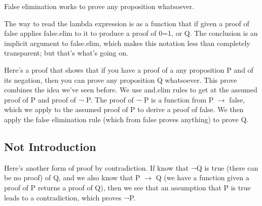 \documentclass[letterpaper,10pt,english]{sphinxmanual}
\begin{document}
False elimination works to prove any proposition whatsoever.

\begin{sphinxVerbatim}[commandchars=\\\{\}]
         
        
\end{sphinxVerbatim}

The way to read the lambda expression is as a function that if given a
proof of false applies false.elim to it to produce a proof of 0=1,
or Q. The conclusion is an implicit argument to false.elim, which
makes this notation less than completely transparent; but that’s
what’s going on.

Here’s a proof that shows that if you have a proof of a any
proposition P and of its negation, then you can prove any proposition
Q whatsoever.  This prove combines the idea we’ve seen before.  We use
and.elim rules to get at the assumed proof of P and proof of ¬ P. The
proof of ¬ P is a function from P \(\rightarrow\) false, which we apply to the
assumed proof of P to derive a proof of false. We then apply the false
elimination rule (which from false proves anything) to prove Q.

\begin{sphinxVerbatim}[commandchars=\\\{\}]
            
            
               
\end{sphinxVerbatim}


\subsection{Not Introduction}
\label{\detokenize{15-proofs:not-introduction}}
Here’s another form of proof by contradiction.  If know that ¬Q is
true (there can be no proof) of Q, and we also know that P \(\rightarrow\) Q (we
have a function  given a proof of P returns a proof of Q), then we
see that an assumption that P is true leads to a contradiction, which
proves ¬P.
\end{document}
